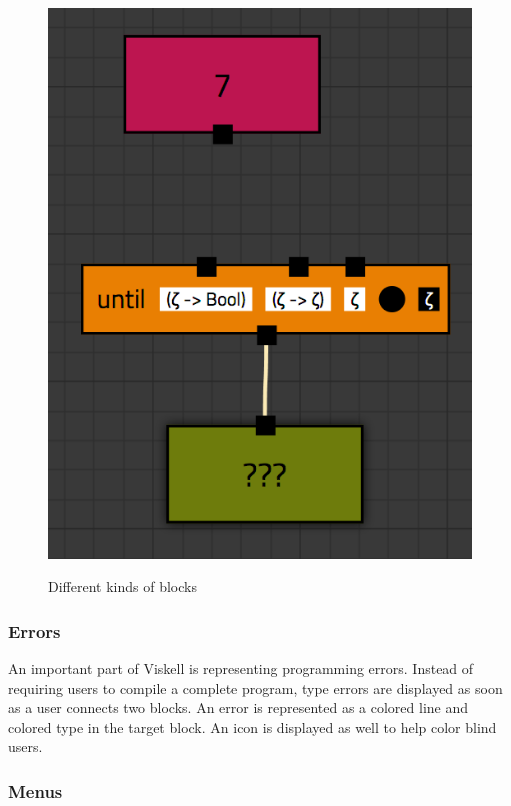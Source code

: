 \begin{figure}[p]
	\centering
	\includegraphics[scale=0.5]{Images/blocks-example}
	\label{fig:blocks-example}
	\caption{Different kinds of blocks}
\end{figure}


\subsubsection{Errors}

An important part of Viskell is representing programming errors.
Instead of requiring users to compile a complete program, type errors are displayed as soon as a user connects two blocks.
An error is represented as a colored line and colored type in the target block.
An icon is displayed as well to help color blind users.

\subsubsection{Menus}

